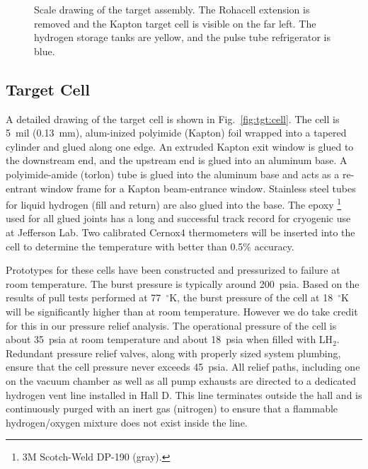 
\begin{figure}[h]
\begin{center}
\end{center}
\caption{
Scale drawing of the target assembly.  The Rohacell extension is
removed and the Kapton target cell is visible on the far left.  The
hydrogen storage tanks are yellow, and the pulse tube refrigerator is
blue.
\label{fig:tgt:pict}}
\end{figure}


\subsection[Target Cell]{Target Cell \label{sec:tgt:cell}}

A detailed drawing of the target cell is shown in
Fig.~\ref{fig:tgt:cell}.  The cell is 5~mil (0.13~mm), alum-inized
polyimide (Kapton) foil wrapped into a tapered cylinder and glued
along one edge.  An extruded Kapton exit window is glued to the
downstream end, and the upstream end is glued into an aluminum base.
A polyimide-amide (torlon) tube is glued into the aluminum base and
acts as a re-entrant window frame for a Kapton beam-entrance window.
Stainless steel tubes for liquid hydrogen (fill and return) are also
glued into the base.  The epoxy%
\footnote{3M Scotch-Weld DP-190 (gray).}
used for all
glued joints has a long and successful track record for cryogenic use
at Jefferson Lab.  Two calibrated Cernox4 thermometers will be
inserted into the cell to determine the temperature with better than
0.5\% accuracy.

Prototypes for these cells have been constructed and pressurized to
failure at room temperature.  The burst pressure is typically around
200~psia. Based on the results of pull tests performed at 77~$^\circ$K, the
burst pressure of the cell at 18~$^\circ$K will be significantly higher than
at room temperature.  However we do take credit for this in our
pressure relief analysis.  The operational pressure of the cell is
about 35~psia at room temperature and about 18~psia when filled with
LH$_2$. Redundant pressure relief valves, along with properly sized
system plumbing, ensure that the cell pressure never exceeds 45~psia.
All relief paths, including one on the vacuum chamber as well as all
pump exhausts are directed to a dedicated hydrogen vent line installed
in Hall D.  This line terminates outside the hall and is continuously
purged with an inert gas (nitrogen) to ensure that a flammable
hydrogen/oxygen mixture does not exist inside the line.

